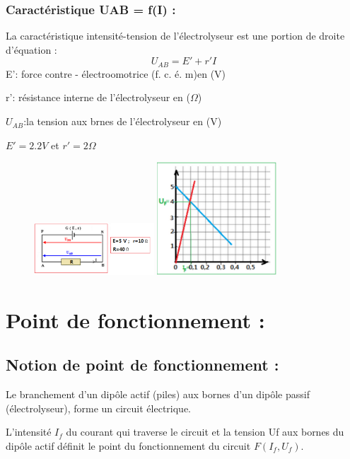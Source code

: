 \documentclass[12pt]{article}
\begin{document}
\subsubsection{Caractéristique UAB = f(I) :}
La caractéristique intensité-tension de l’électrolyseur est une portion de droite d’équation :
$$U_{AB} = E' + r'I$$
E': force contre - électroomotrice (f. c. é. m)en (V)

r': résistance interne de l'électrolyseur en ($\Omega$)

$U_{AB}$:la tension aux brnes de l'électrolyseur en (V)

$E' = 2.2V$ et $r' = 2\Omega$

\begin{figure}
\begin{center}
  \vspace{-2cm}
\includegraphics[width=0.4\textwidth]{./img/Montage_12.png}
\includegraphics[width=0.4\textwidth]{./img/fonct_point.png}
\end{center}
\end{figure}


\section{Point de fonctionnement :}
\subsection{Notion de point de fonctionnement :}
Le branchement d’un dipôle actif (piles) aux bornes d’un dipôle passif (électrolyseur), forme un circuit électrique.

L’intensité $I_f$ du courant qui traverse le circuit et la tension Uf aux bornes du dipôle actif définit le point du fonctionnement du circuit $F(I_f ,U_f)$.
\end{document}
